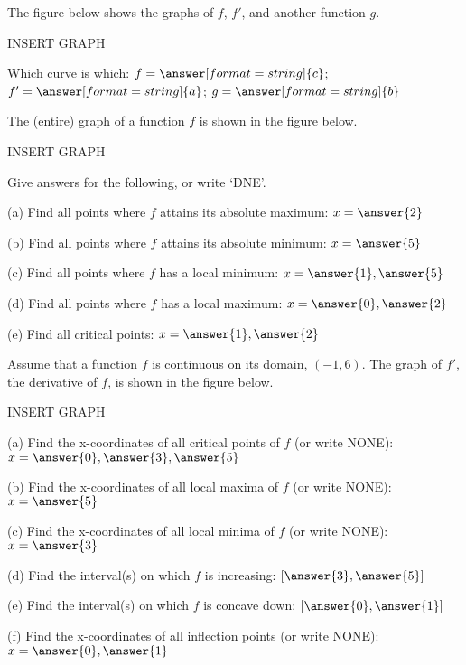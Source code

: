 \documentclass{ximera}
\begin{document}
\begin{exercise}
The figure below shows the graphs of $f$, $f'$, and another function $g$.

INSERT GRAPH

Which curve is which: $f=\answer[format=string]{c}$; $f'=\answer[format=string]{a}$; $g=\answer[format=string]{b}$
\end{exercise}

\begin{exercise}
The (entire) graph of a function $f$ is shown in the figure below.

INSERT GRAPH

Give answers for the following, or write `DNE'.

(a) Find all points where $f$ attains its absolute maximum: $x=\answer{2}$

(b) Find all points where $f$ attains its absolute minimum: $x=\answer{5}$

(c) Find all points where $f$ has a local minimum: $x=\answer{1},\answer{5}$

(d) Find all points where $f$ has a local maximum: $x=\answer{0},\answer{2}$

(e) Find all critical points: $x=\answer{1},\answer{2}$
\end{exercise}

\begin{exercise}
Assume that a function $f$ is continuous on its domain, $(-1,6)$. The graph of $f'$, the derivative of $f$, is shown in the figure below.

INSERT GRAPH

(a) Find the x-coordinates of all critical points of $f$ (or write NONE): $x=\answer{0},\answer{3},\answer{5}$

(b) Find the x-coordinates of all local maxima of $f$ (or write NONE): $x=\answer{5}$

(c) Find the x-coordinates of all local minima of $f$ (or write NONE): $x=\answer{3}$

(d) Find the interval(s) on which $f$ is increasing: $[\answer{3},\answer{5}]$

(e) Find the interval(s) on which $f$ is concave down: $[\answer{0},\answer{1}]$

(f) Find the x-coordinates of all inflection points (or write NONE): $x=\answer{0},\answer{1}$
\end{exercise}
\end{document}
